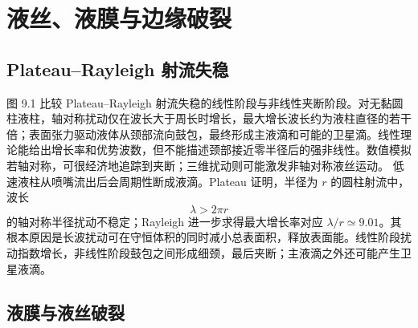 \documentclass[11pt,a4paper,openany,fontset=none]{ctexbook}
\begin{document}
\section{液丝、液膜与边缘破裂}

\subsection{Plateau--Rayleigh 射流失稳}

图 9.1 比较 Plateau--Rayleigh 射流失稳的线性阶段与非线性夹断阶段。对无黏圆柱液柱，轴对称扰动仅在波长大于周长时增长，最大增长波长约为液柱直径的若干倍；表面张力驱动液体从颈部流向鼓包，最终形成主液滴和可能的卫星滴。线性理论能给出增长率和优势波数，但不能描述颈部接近零半径后的强非线性。数值模拟若轴对称，可很经济地追踪到夹断；三维扰动则可能激发非轴对称液丝运动。
低速液柱从喷嘴流出后会周期性断成液滴。Plateau 证明，半径为 $r$ 的圆柱射流中，波长
\begin{equation}
 \lambda>2\pi r
\end{equation}
的轴对称半径扰动不稳定；Rayleigh 进一步求得最大增长率对应
$\lambda/r\simeq9.01$。其根本原因是长波扰动可在守恒体积的同时减小总表面积，释放表面能。线性阶段扰动指数增长，非线性阶段鼓包之间形成细颈，最后夹断；主液滴之外还可能产生卫星液滴。

\subsection{液膜与液丝破裂}
\end{document}
